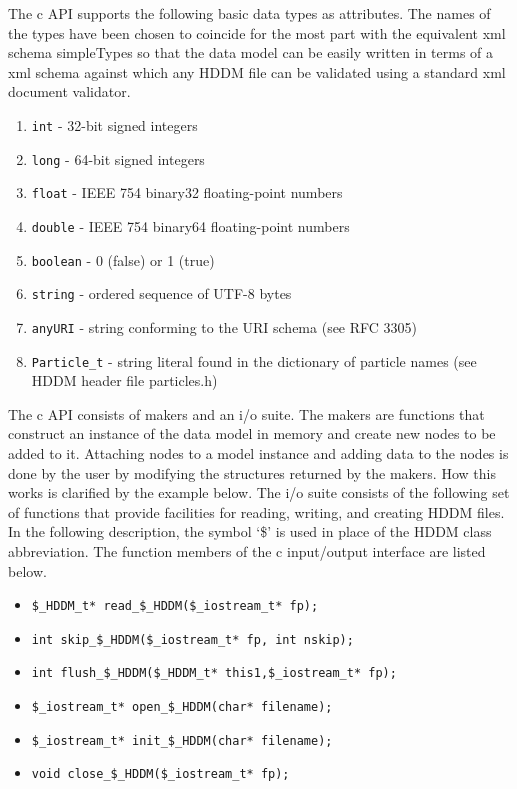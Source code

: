 \documentclass{revtex4}
\begin{document}
The c API supports the following basic data types as attributes.
The names of the types have been chosen to coincide for the most part with the
equivalent xml schema simpleTypes so that the data model can be easily written
in terms of a xml schema against which any HDDM file can be validated using a
standard xml document validator.
\begin{enumerate}
\item \texttt{int} - 32-bit signed integers
\item \texttt{long} - 64-bit signed integers
\item \texttt{float} - IEEE 754 binary32 floating-point numbers
\item \texttt{double} - IEEE 754 binary64 floating-point numbers
\item \texttt{boolean} - 0 (false) or 1 (true)
\item \texttt{string} - ordered sequence of UTF-8 bytes
\item \texttt{anyURI} - string conforming to the URI schema (see RFC 3305)
\item \texttt{Particle\_t} - string literal found in the dictionary of particle
names (see HDDM header file particles.h)
\end{enumerate}

The c API consists of makers and an i/o suite.  The makers are functions that
construct an instance of the data model in memory and create new nodes to be
added to it.  Attaching nodes to a model instance and adding data to the nodes
is done by the user by modifying the structures returned by the makers.  How
this works is clarified by the example below.  The i/o suite consists of the
following set of functions that provide facilities for reading, writing, and
creating HDDM files.  In the following description, the symbol `\$' is used in
place of the HDDM class abbreviation. The function members of the c input/output 
interface are listed below.

\begin{itemize}
\item \texttt{\$\_HDDM\_t* read\_\$\_HDDM(\$\_iostream\_t* fp);}
\item \texttt{int skip\_\$\_HDDM(\$\_iostream\_t* fp, int nskip);}
\item \texttt{int flush\_\$\_HDDM(\$\_HDDM\_t* this1,\$\_iostream\_t* fp);}
\item \texttt{\$\_iostream\_t* open\_\$\_HDDM(char* filename);}
\item \texttt{\$\_iostream\_t* init\_\$\_HDDM(char* filename);}
\item \texttt{void close\_\$\_HDDM(\$\_iostream\_t* fp);}
\end{itemize}
\end{document}
